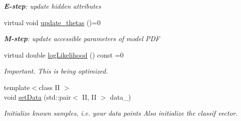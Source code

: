 \begin{DoxyCompactItemize}
\begin{DoxyCompactList}\small\item\em {\bfseries E-\/step}: update hidden attributes \item\end{DoxyCompactList}\item 
\hypertarget{classCDA_1_1EM_a479e5c57713312a4089e89bb522e2769}{
virtual void \hyperlink{classCDA_1_1EM_a479e5c57713312a4089e89bb522e2769}{update\_\-thetas} ()=0}
\label{classCDA_1_1EM_a479e5c57713312a4089e89bb522e2769}

\begin{DoxyCompactList}\small\item\em {\bfseries M-\/step}: update accessible parameters of model PDF \item\end{DoxyCompactList}\item 
\hypertarget{classCDA_1_1EM_affb4273a70cd7562cc5d517412c4fcdb}{
virtual double \hyperlink{classCDA_1_1EM_affb4273a70cd7562cc5d517412c4fcdb}{logLikelihood} () const =0}
\label{classCDA_1_1EM_affb4273a70cd7562cc5d517412c4fcdb}

\begin{DoxyCompactList}\small\item\em Important. This is being optimized. \item\end{DoxyCompactList}\item 
{\footnotesize template$<$class II $>$ }\\void \hyperlink{classCDA_1_1EM_ad1ee8ed5cef87cfabf708fe8d469b77f}{setData} (std::pair$<$ II, II $>$ data\_\-)
\begin{DoxyCompactList}\small\item\em Initialize known samples, i.e. your data points Also initialize the classif vector. \item\end{DoxyCompactList}\end{DoxyCompactItemize}
